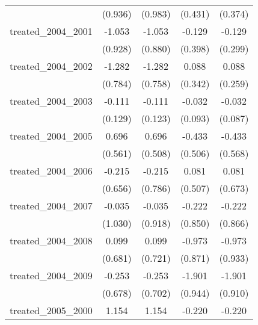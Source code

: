 {\begin{tabular}{l*{4}{c}}
            &     (0.936)         &     (0.983)         &     (0.431)         &     (0.374)         \\
[1em]
treated\_2004\_2001&      -1.053         &      -1.053         &      -0.129         &      -0.129         \\
            &     (0.928)         &     (0.880)         &     (0.398)         &     (0.299)         \\
[1em]
treated\_2004\_2002&      -1.282         &      -1.282         &       0.088         &       0.088         \\
            &     (0.784)         &     (0.758)         &     (0.342)         &     (0.259)         \\
[1em]
treated\_2004\_2003&      -0.111         &      -0.111         &      -0.032         &      -0.032         \\
            &     (0.129)         &     (0.123)         &     (0.093)         &     (0.087)         \\
[1em]
treated\_2004\_2005&       0.696         &       0.696         &      -0.433         &      -0.433         \\
            &     (0.561)         &     (0.508)         &     (0.506)         &     (0.568)         \\
[1em]
treated\_2004\_2006&      -0.215         &      -0.215         &       0.081         &       0.081         \\
            &     (0.656)         &     (0.786)         &     (0.507)         &     (0.673)         \\
[1em]
treated\_2004\_2007&      -0.035         &      -0.035         &      -0.222         &      -0.222         \\
            &     (1.030)         &     (0.918)         &     (0.850)         &     (0.866)         \\
[1em]
treated\_2004\_2008&       0.099         &       0.099         &      -0.973         &      -0.973         \\
            &     (0.681)         &     (0.721)         &     (0.871)         &     (0.933)         \\
[1em]
treated\_2004\_2009&      -0.253         &      -0.253         &      -1.901\sym{*}  &      -1.901\sym{*}  \\
            &     (0.678)         &     (0.702)         &     (0.944)         &     (0.910)         \\
[1em]
treated\_2005\_2000&       1.154         &       1.154         &      -0.220         &      -0.220         \\

\end{tabular}}
